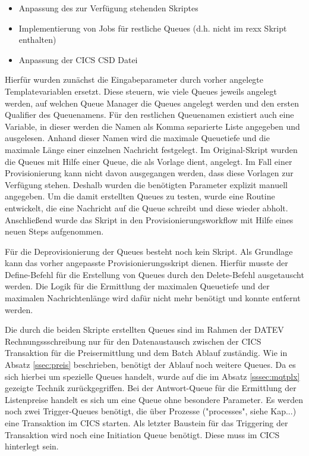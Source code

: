 \begin{samepage}
\begin{itemize}
\item Anpassung des zur Verfügung stehenden Skriptes
\item Implementierung von Jobs für restliche Queues (d.h. nicht im rexx Skript enthalten)
\item Anpassung der CICS CSD Datei
\end{itemize}
\end{samepage}

Hierfür wurden zunächst die Eingabeparameter durch vorher angelegte Templatevariablen ersetzt.
Diese steuern, wie viele Queues jeweils angelegt werden, auf welchen Queue Manager die Queues angelegt werden und den ersten Qualifier des Queuenamens.
Für den restlichen Queuenamen existiert auch eine Variable, in dieser werden die Namen als Komma separierte Liste angegeben und ausgelesen.
Anhand dieser Namen wird  die maximale Queuetiefe und die maximale Länge einer einzelnen Nachricht festgelegt.
Im Original-Skript wurden die Queues mit Hilfe einer Queue, die als Vorlage dient, angelegt.
Im Fall einer Provisionierung kann nicht davon ausgegangen werden, dass diese Vorlagen zur Verfügung stehen.
Deshalb wurden die benötigten Parameter explizit manuell angegeben.
Um die damit erstellten Queues zu testen, wurde eine Routine entwickelt, die eine Nachricht auf die Queue schreibt und diese wieder abholt.
Anschließend wurde das Skript in den Provisionierungsworkflow mit Hilfe eines neuen Steps aufgenommen.

Für die Deprovisionierung der Queues besteht noch kein Skript.
Als Grundlage kann das vorher angepasste Provisionierungsskript dienen.
Hierfür musste der \glqq Define\grqq-Befehl für die Erstellung von Queues durch den \glqq Delete\grqq-Befehl ausgetauscht werden.
Die Logik für die Ermittlung der maximalen Queuetiefe und der maximalen Nachrichtenlänge wird dafür nicht mehr benötigt und konnte entfernt werden.

Die durch die beiden Skripte erstellten Queues sind im Rahmen der DATEV Rechnungssschreibung nur für den Datenaustausch zwischen der CICS Transaktion für die Preisermittlung und dem Batch Ablauf zuständig.
Wie in Absatz \ref{ssec:preis} beschrieben, benötigt der Ablauf noch weitere Queues.
Da es sich hierbei um spezielle Queues handelt, wurde auf die im Absatz \ref{sssec:mqtplx} gezeigte Technik zurückgegriffen.
Bei der Antwort-Queue für die Ermittlung der Listenpreise handelt es sich um eine Queue ohne besondere Parameter.
Es werden noch zwei Trigger-Queues benötigt, die über Prozesse ("processes", siehe Kap...) eine Transaktion im CICS starten.
Als letzter Baustein für das Triggering der Transaktion wird noch eine Initiation Queue benötigt.
Diese muss im CICS hinterlegt sein.

